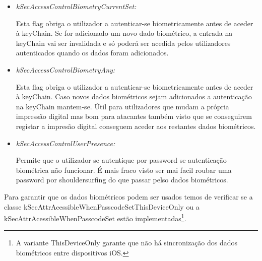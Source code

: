 \begin{itemize}

\item \textit{kSecAccessControlBiometryCurrentSet:}\par
	\hfill\par
	Esta flag obriga o utilizador a autenticar-se biometricamente antes de aceder à keyChain. Se for adicionado um novo dado biométrico, a entrada na keyChain vai ser invalidada e só poderá ser acedida pelos utilizadores autenticados quando os dados foram adicionados.\par
	\hfill\par

\item \textit{kSecAccessControlBiometryAny:}\par
	\hfill\par
	Esta flag obriga o utilizador a autenticar-se biometricamente antes de aceder à keyChain. Caso novos dados biométricos sejam adicionados a autenticação na keyChain mantem-se. Útil para utilizadores que mudam a própria impressão digital mas bom para atacantes também visto que se conseguirem registar a impresão digital conseguem aceder aos restantes dados biométricos.\par
	\hfill\par

\item \textit{kSecAccessControlUserPresence:}\par
	\hfill\par
	Permite que o utilizador se autentique por password se autenticação biométrica não funcionar. É mais fraco visto ser mai facil roubar uma password por shouldersurfing do que passar pelso dados biométricos.
\end{itemize}

Para garantir que os dados biométricos podem ser usados temos de verificar se a classe kSecAttrAcessibleWhenPasscodeSetThisDeviceOnly ou a kSecAttrAcessibleWhenPasscodeSet estão implementadas\footnote[5]{A variante ThisDeviceOnly garante que não há sincronização dos dados biométricos entre dispositivos iOS.}.\par
\hfill\par

